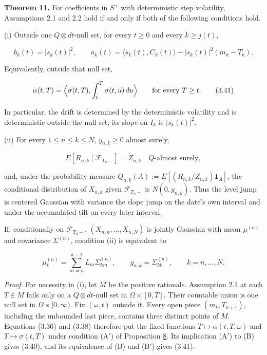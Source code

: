 \documentclass[11pt]{article}
\begin{document}
\label{res:Theorem-11}
\textbf{Theorem 11.} For coefficients in \(S^+\) with deterministic step volatility, Assumptions 2.1 and 2.2 hold if and only if both of the following conditions hold.

(i) Outside one \(Q \otimes dt\)-null set, for every \(t \ge 0\) and every \(k \ge j(t)\),

\begin{equation*}
b_k(t) = |s_k(t)|^2, \qquad a_k(t) = \langle s_k(t),C_k(t)\rangle - |s_k(t)|^2(m_k-T_k). \tag{3.40}\label{eq:3.40}
\end{equation*}

Equivalently, outside that null set,

\begin{equation*}
\alpha(t,T) = \Bigl\langle \sigma(t,T),\int_t^T \sigma(t,u)\,du\Bigr\rangle \qquad \text{for every } T \ge t. \tag{3.41}\label{eq:3.41}
\end{equation*}

In particular, the drift is determined by the deterministic volatility and is deterministic outside the null set; its slope on \(I_k\) is \(|s_k(t)|^2\).

(ii) For every \(1 \le n \le k \le N\), \(y_{n,k} \ge 0\) almost surely,

\begin{equation*}
E[R_{n,k}\mid\mathcal F_{T_n-}] = Z_{n,k} \quad Q\text{-almost surely}, \tag{3.42}\label{eq:3.42}
\end{equation*}

and, under the probability measure \(Q_{n,k}(A) := E[(R_{n,k}/Z_{n,k})\mathbf 1_A]\), the conditional distribution of \(X_{n,k}\) given \(\mathcal F_{T_n-}\) is \(N(0,y_{n,k})\). Thus the level jump is centered Gaussian with variance the slope jump on the date's own interval and under the accumulated tilt on every later interval.

If, conditionally on \(\mathcal F_{T_n-}\), \((X_{n,n},\dots,X_{n,N})\) is jointly Gaussian with mean \(\mu^{(n)}\) and covariance \(\Sigma^{(n)}\), condition (ii) is equivalent to

\begin{equation*}
\mu^{(n)}_k = \sum_{m=n}^{k-1}L_m\Sigma^{(n)}_{km}, \qquad y_{n,k} = \Sigma^{(n)}_{kk}, \qquad k=n,\dots,N. \tag{3.43}\label{eq:3.43}
\end{equation*}

\emph{Proof.} For necessity in (i), let \(M\) be the positive rationals. Assumption 2.1 at each \(T \in M\) fails only on a \(Q \otimes dt\)-null set in \(\Omega \times [0,T]\). Their countable union is one null set in \(\Omega \times [0,\infty)\). Fix \((\omega,t)\) outside it. Every open piece \((m_k,T_{k+1})\), including the unbounded last piece, contains three distinct points of \(M\). Equations (3.36) and (3.38) therefore put the fixed functions \(T \mapsto \alpha(t,T,\omega)\) and \(T \mapsto \sigma(t,T)\) under condition (A\('\)) of Proposition \hyperref[res:Proposition-8]{8}. Its implication (A\('\)) to (B) gives (3.40), and its equivalence of (B) and (B\('\)) gives (3.41).
\end{document}
